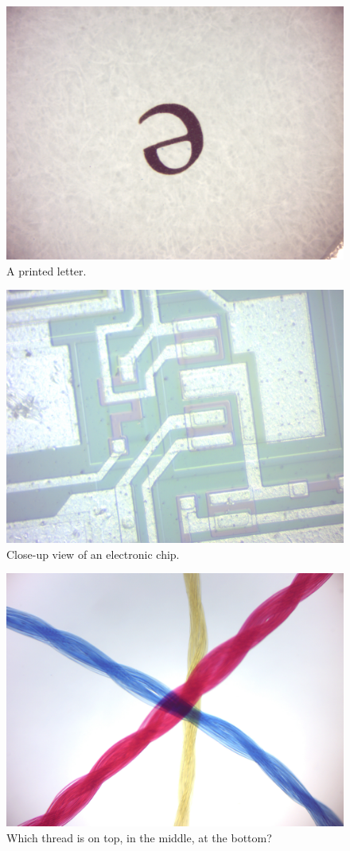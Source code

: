 \begin{figure}

{\centering \includegraphics[width=0.7\linewidth]{./figures/microscope/Letter_e} 

}

\caption{A printed letter.}\label{fig:letter}
\end{figure}

\begin{figure}

{\centering \includegraphics[width=0.7\linewidth]{./figures/microscope/Chip} 

}

\caption{Close-up view of an electronic chip.}\label{fig:chip}
\end{figure}

\begin{figure}

{\centering \includegraphics[width=0.7\linewidth]{./figures/microscope/Threads} 

}

\caption{Which thread is on top, in the middle, at the bottom?}\label{fig:threads}
\end{figure}

